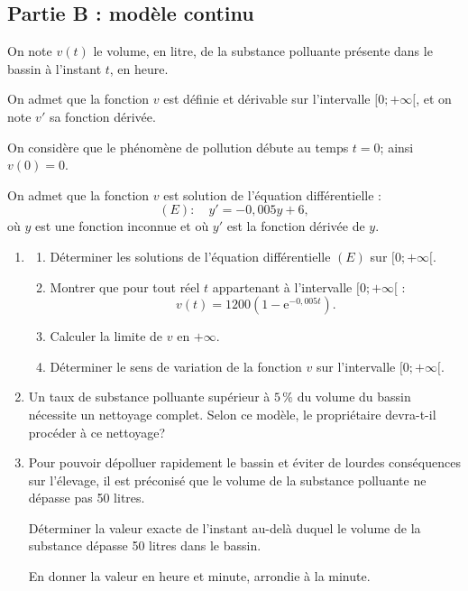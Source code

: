 \documentclass[10pt]{article}
\providecommand{\e}{{\mathrm{e}}}
\begin{document}
	\subsection*{\centering Partie B : modèle continu}

		On note $v(t)$ le volume, en litre, de la substance polluante présente dans le bassin à l'instant $t$, en heure.

		On admet que la fonction $v$ est définie et dérivable sur l'intervalle $[0 ;+\infty[$, et on note $v'$ sa fonction dérivée.

		On considère que le phénomène de pollution débute au temps $t=0$; ainsi $v(0)=0$.

		On admet que la fonction $v$ est solution de l'équation différentielle :
		\[(E) : \quad y'=-0,005 y+6,\]
		où $y$ est une fonction inconnue et où $y'$ est la fonction dérivée de $y$.

		\begin{enumerate}
			\item \begin{enumerate}
				\item Déterminer les solutions de l'équation différentielle $(E)$ sur $[0 ;+\infty[$.

				\item Montrer que pour tout réel $t$ appartenant à l'intervalle $[0 ;+\infty[$ :
				\[v(t)=1200\left(1-\e^{-0,005 t}\right).\]

				\item Calculer la limite de $v$ en $+\infty$.

				\item Déterminer le sens de variation de la fonction $v$ sur l'intervalle $[0 ;+\infty[$.
			\end {enumerate}

			\item Un taux de substance polluante supérieur à $5\,\%$ du volume du bassin nécessite un nettoyage complet.
			Selon ce modèle, le propriétaire devra-t-il procéder à ce nettoyage?

			\item Pour pouvoir dépolluer rapidement le bassin et éviter de lourdes conséquences sur l'élevage, il est préconisé que le volume de la substance polluante ne dépasse pas 50 litres.

			Déterminer la valeur exacte de l'instant au-delà duquel le volume de la substance dépasse 50 litres dans le bassin.

			En donner la valeur en heure et minute, arrondie à la minute.
		\end{enumerate}
\end{document}

